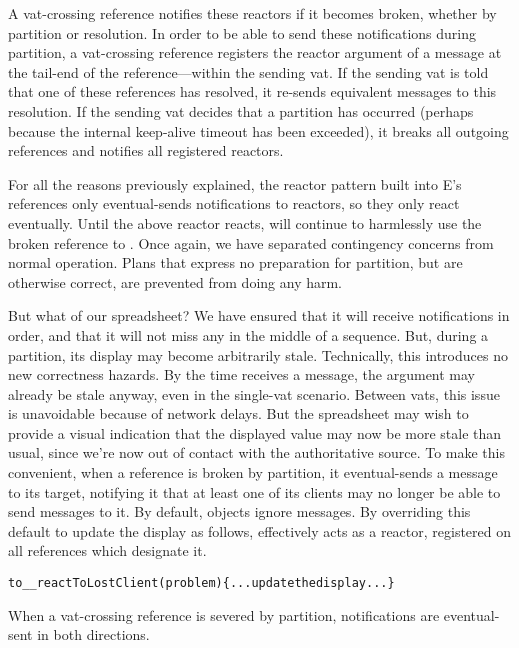 \documentclass{llncs}
\begin{document}
A vat-crossing reference notifies these reactors if it becomes broken,
whether by partition or resolution. In order to be able to send these
notifications during partition, a vat-crossing reference registers the
reactor argument of a  message at the tail-end of
the reference---within the sending vat. If the sending vat is told
that one of these references has resolved, it re-sends equivalent
 messages to this resolution. If the sending vat
decides that a partition has occurred (perhaps because the internal
keep-alive timeout has been exceeded), it breaks all outgoing
references and notifies all registered reactors.

For all the reasons previously explained, the reactor pattern built
into E's references only eventual-sends notifications to reactors, so
they only react eventually. Until the above reactor reacts, 
will continue to harmlessly use the broken reference to
. Once again, we have separated contingency concerns from
normal operation. Plans that express no preparation for partition, but
are otherwise correct, are prevented from doing any harm.

But what of our spreadsheet? We have ensured that it will receive
 notifications in order, and that it will not miss
any in the middle of a sequence. But, during a partition, its display
may become arbitrarily stale. Technically, this introduces no new
correctness hazards. By the time  receives a
 message, the  argument may already
be stale anyway, even in the single-vat scenario. Between vats, this
issue is unavoidable because of network delays. But the spreadsheet
may wish to provide a visual indication that the displayed value may
now be more stale than usual, since we're now out of contact with the
authoritative source. To make this convenient, when a reference is
broken by partition, it eventual-sends a 
message to its target, notifying it that at least one of its clients
may no longer be able to send messages to it. By default, objects
ignore  messages. By overriding this
default to update the display as follows,  effectively acts
as a reactor, registered on all references which designate it.
%
\begin{alltt}
    to \_\_reactToLostClient(problem) \{ ...update the display... \}
\end{alltt}
%
When a vat-crossing reference is severed by partition, notifications
are eventual-sent in both directions. 
\end{document}
